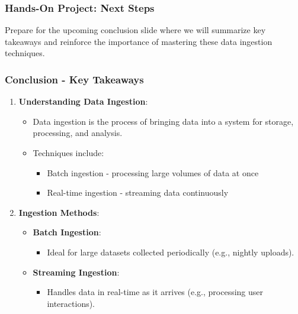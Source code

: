 \documentclass[aspectratio=169]{beamer}
\begin{document}
\begin{frame}[fragile]
    \frametitle{Hands-On Project: Next Steps}
    Prepare for the upcoming conclusion slide where we will summarize key takeaways and reinforce the importance of mastering these data ingestion techniques.
\end{frame}

\begin{frame}[fragile]
    \frametitle{Conclusion - Key Takeaways}
    
    \begin{enumerate}
        \item \textbf{Understanding Data Ingestion}:
        \begin{itemize}
            \item Data ingestion is the process of bringing data into a system for storage, processing, and analysis.
            \item Techniques include:
            \begin{itemize}
                \item Batch ingestion - processing large volumes of data at once
                \item Real-time ingestion - streaming data continuously
            \end{itemize}
        \end{itemize}
        
        \item \textbf{Ingestion Methods}:
        \begin{itemize}
            \item \textbf{Batch Ingestion}:
            \begin{itemize}
                \item Ideal for large datasets collected periodically (e.g., nightly uploads).
            \end{itemize}
            \item \textbf{Streaming Ingestion}:
            \begin{itemize}
                \item Handles data in real-time as it arrives (e.g., processing user interactions).
            \end{itemize}
        \end{itemize}
    \end{enumerate}
\end{frame}
\end{document}
